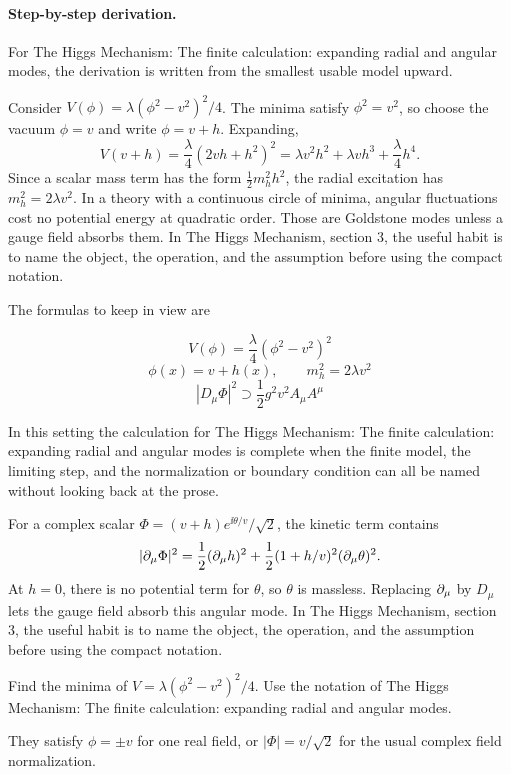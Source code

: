 \paragraph{Step-by-step derivation.}

For The Higgs Mechanism: The finite calculation: expanding radial and angular modes, the derivation is written from the smallest usable model upward.

Consider \(V(\phi)=\lambda(\phi^2-v^2)^2/4\).  The minima satisfy \(\phi^2=v^2\), so choose the vacuum \(\phi=v\) and write \(\phi=v+h\).  Expanding,
\[
  V(v+h)=\frac{\lambda}{4}(2vh+h^2)^2
  =\lambda v^2h^2+\lambda vh^3+\frac{\lambda}{4}h^4.
\]
Since a scalar mass term has the form \(\frac12m_h^2h^2\), the radial excitation has \(m_h^2=2\lambda v^2\).  In a theory with a continuous circle of minima, angular fluctuations cost no potential energy at quadratic order.  Those are Goldstone modes unless a gauge field absorbs them.  In The Higgs Mechanism, section 3, the useful habit is to name the object, the operation, and the assumption before using the compact notation.

The formulas to keep in view are

\[
  V(\phi)=\frac{\lambda}{4}(\phi^2-v^2)^2
\]
\[
  \phi(x)=v+h(x),\qquad m_h^2=2\lambda v^2
\]
\[
  |D_\mu\Phi|^2\supset \frac12g^2v^2A_\mu A^\mu
\]

In this setting the calculation for The Higgs Mechanism: The finite calculation: expanding radial and angular modes is complete when the finite model, the limiting step, and the normalization or boundary condition can all be named without looking back at the prose.




\begin{example}
For a complex scalar \(\Phi=(v+h)e^{\ii\theta/v}/\sqrt2\), the kinetic term contains
\[
  |\partial_\mu\Phi|^2=\frac12(\partial_\mu h)^2+\frac12(1+h/v)^2(\partial_\mu\theta)^2.
\]
At \(h=0\), there is no potential term for \(\theta\), so \(\theta\) is massless.  Replacing \(\partial_\mu\) by \(D_\mu\) lets the gauge field absorb this angular mode.  In The Higgs Mechanism, section 3, the useful habit is to name the object, the operation, and the assumption before using the compact notation.
\end{example}



\begin{exercise}
Find the minima of \(V=\lambda(\phi^2-v^2)^2/4\).  Use the notation of The Higgs Mechanism: The finite calculation: expanding radial and angular modes.
\begin{answer}
They satisfy \(\phi=\pm v\) for one real field, or \(|\Phi|=v/\sqrt2\) for the usual complex field normalization.
\end{answer}
\end{exercise}

